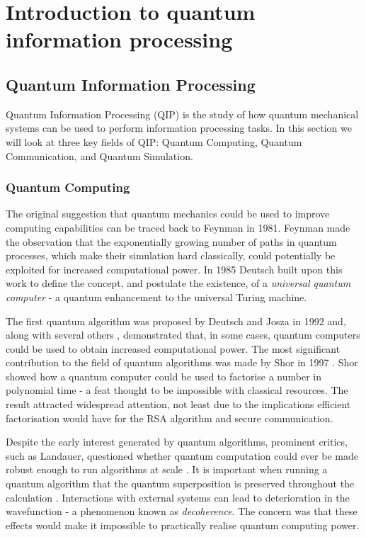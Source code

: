 \chapter{Introduction to quantum information processing} 
\label{ch:Introduction}

\section{Quantum Information Processing}

Quantum Information Processing (QIP) is the study of how quantum mechanical systems can be used to perform information processing tasks. In this section we will look at three key fields of QIP: Quantum Computing, Quantum Communication, and Quantum Simulation.

\subsection{Quantum Computing}

The original suggestion that quantum mechanics could be used to improve computing capabilities can be traced back to Feynman \cite{feynman_82} in 1981. Feynman made the observation that the exponentially growing number of paths in quantum processes, which make their simulation hard classically, could potentially be exploited for increased computational power. In 1985 Deutsch built upon this work to define the concept, and postulate the existence, of a \textit{universal quantum computer} \cite{deutsch_85} - a quantum enhancement to the universal Turing machine. 

The first quantum algorithm was proposed by Deutsch and Josza \cite{deutsch_jozsa_92} in 1992 and, along with several others \cite{simon_94, grovers_search}, demonstrated that, in some cases, quantum computers could be used to obtain increased computational power. The most significant contribution to the field of quantum algorithms was made by Shor in 1997 \cite{shors_algorithm}. Shor showed how a quantum computer could be used to factorise a number in polynomial time - a feat thought to be impossible with classical resources. The result attracted widespread attention, not least due to the implications efficient factorisation would have for the RSA algorithm \cite{rsa} and secure communication.

Despite the early interest generated by quantum algorithms, prominent critics, such as Landauer, questioned whether quantum computation could ever be made robust enough to run algorithms at scale \cite{landauer_96}. It is important when running a quantum algorithm that the quantum superposition is preserved throughout the calculation \cite{nature_cq_review_10}. Interactions with external systems can lead to deterioration in the wavefunction - a phenomenon known as \textit{decoherence}. The concern was that these effects would make it impossible to practically realise quantum computing power.

